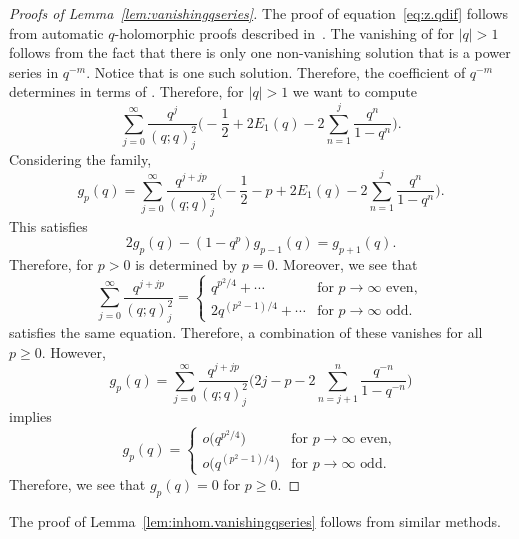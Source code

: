 \documentclass[pdftex]{sigma}
\numberwithin{equation}{section}
\begin{document}
\begin{proof}[Proofs of Lemma~\ref{lem:vanishingqseries}]
The proof of equation~\eqref{eq:z.qdif} follows from automatic $q$-holomorphic proofs described in~\cite{WilfZeil}. The vanishing of  for $|q|>1$ follows from the fact that there is only one non-vanishing solution that is a power series in $q^{-m}$. Notice that  is one such solution. Therefore, the coefficient of $q^{-m}$ determines  in terms of . Therefore, for $|q|>1$ we want to compute
\[
 \sum_{j=0}^{\infty}
 \frac{q^{j}}{(q;q)_{j}^2}\biggl(-\frac{1}{2}+2E_{1}(q)-2\sum_{n=1}^{j}\frac{q^n}{1-q^n}\biggr) .
\]
Considering the family,
\[
 g_p(q)
  =
 \sum_{j=0}^{\infty}
 \frac{q^{j+jp}}{(q;q)_{j}^2}\biggl(-\frac{1}{2}-p+2E_{1}(q)-2\sum_{n=1}^{j}\frac{q^n}{1-q^n}\biggr) .
\]
This satisfies
\[
 2g_{p}(q)-(1-q^p)g_{p-1}(q)
  =
 g_{p+1}(q) .
\]
Therefore, for $p>0$ is determined by $p=0$. Moreover, we see that
\[
 \sum_{j=0}^{\infty}
 \frac{q^{j+jp}}{(q;q)_{j}^2}
  =
\begin{cases}
 q^{p^2/4}+\cdots & \text{for }p\to\infty\text{ even} ,\\
 2q^{(p^2-1)/4}+\cdots & \text{for }p\to\infty\text{ odd} .
 \end{cases}
 \]
satisfies the same equation. Therefore, a combination of these vanishes for all $p\geq0$. However,
\[
 g_{p}(q)
  =
 \sum_{j=0}^{\infty}
 \frac{q^{j+jp}}{(q;q)_{j}^2}\biggl(2j-p-2\sum_{n=j+1}^{n}\frac{q^{-n}}{1-q^{-n}}\biggr)
\]
implies
\[
 g_{p}(q)
  =
 \begin{cases}
 o\bigl(q^{p^2/4}\bigr) & \text{for }p\to\infty\text{ even} ,\\
 o\bigl(q^{(p^2-1)/4}\bigr) & \text{for }p\to\infty\text{ odd} .
 \end{cases}
\]
Therefore, we see that $g_{p}(q)=0$ for $p\geq0$.
\end{proof}

The proof of Lemma~\ref{lem:inhom.vanishingqseries} follows from similar methods.
\end{document}
